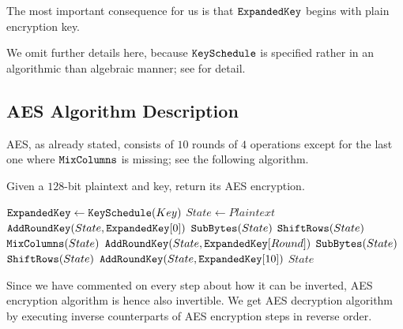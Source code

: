 	\begin{note}
	\label{note:expkey}
		The most important consequence for us is that $\texttt{ExpandedKey}$ begins with plain encryption key.
	\end{note}
	
	We omit further details here, because $\texttt{KeySchedule}$ is specified rather in an algorithmic than algebraic manner; see \cite[pp.43-45]{daemen2013rijndael} for detail.



\subsection{AES Algorithm Description}

AES, as already stated, consists of $10$ rounds of $4$ operations except for the last one where $\texttt{MixColumns}$ is missing; see the following algorithm.

\newpage   %

\begin{alg}
\label{alg:aes}
	Given a $128$-bit plaintext and key, return its AES encryption.
	\begin{algorithmic}[1]
			\State $\texttt{ExpandedKey} \gets \texttt{KeySchedule}(Key)$
			\State $State \gets Plaintext$ \label{line:stateplain}
			\State $\texttt{AddRoundKey}(State, \texttt{ExpandedKey}[0])$ \label{line:addrk}
			 \label{line:aesfor}
				\State $\texttt{SubBytes}(State)$
				\State $\texttt{ShiftRows}(State)$
				\State $\texttt{MixColumns}(State)$
				\State $\texttt{AddRoundKey}(State, \texttt{ExpandedKey}[Round])$
			\EndFor
			\State $\texttt{SubBytes}(State)$
			\State $\texttt{ShiftRows}(State)$
			\State $\texttt{AddRoundKey}(State, \texttt{ExpandedKey}[10])$
			\State\Return $State$
		\EndFunction
	\end{algorithmic}
\end{alg}

\begin{note}
	Since we have commented on every step about how it can be inverted, AES encryption algorithm is hence also invertible. We get AES decryption algorithm by executing inverse counterparts of AES encryption steps in reverse order.
\end{note}



